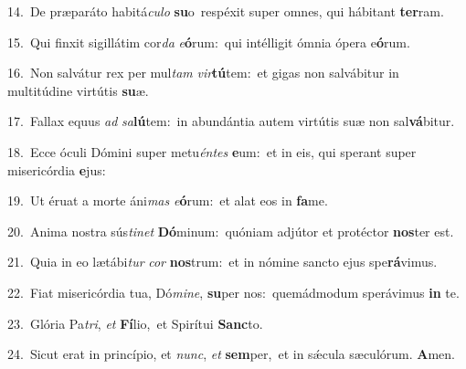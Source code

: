 {\numbfont\textcolor{\numbcolor}{14.}}~De præparáto habitá\-\textit{cu}\-\textit{lo} \textbf{su}\-o~\star respéxit super omnes, qui hábitant \textbf{ter}\-ram.\par
{\numbfont\textcolor{\numbcolor}{15.}}~Qui finxit sigillátim cor\textit{da} \textit{e}\-\textbf{ó}rum:~\star qui intélligit ómnia ópera e\-\textbf{ó}\-rum.\par
{\numbfont\textcolor{\numbcolor}{16.}}~Non salvátur rex per mul\textit{tam} \textit{vir}\-\textbf{tú}tem:~\star et gigas non salvábitur in multitúdine virtútis \textbf{su}\-æ.\par
{\numbfont\textcolor{\numbcolor}{17.}}~Fallax equus \textit{ad} \textit{sa}\-\textbf{lú}tem:~\star in abundántia autem virtútis suæ non sal\-\textbf{vá}\-bitur.\par
{\numbfont\textcolor{\numbcolor}{18.}}~Ecce óculi Dómini super metu\-\textit{én}\-\textit{tes} \textbf{e}\-um:~\star et in eis, qui sperant super misericórdia \textbf{e}\-jus:\par
{\numbfont\textcolor{\numbcolor}{19.}}~Ut éruat a morte áni\textit{mas} \textit{e}\-\textbf{ó}rum:~\star et alat eos in \textbf{fa}\-me.\par
{\numbfont\textcolor{\numbcolor}{20.}}~Anima nostra sús\-\textit{ti}\-\textit{net} \textbf{Dó}\-minum:~\star quóniam adjútor et protéctor \textbf{nos}\-ter est.\par
{\numbfont\textcolor{\numbcolor}{21.}}~Quia in eo lætábi\textit{tur} \textit{cor} \textbf{nos}\-trum:~\star et in nómine sancto ejus spe\-\textbf{rá}\-vimus.\par
{\numbfont\textcolor{\numbcolor}{22.}}~Fiat misericórdia tua, Dó\-\textit{mi}\-\textit{ne}, \textbf{su}\-per nos:~\star quemádmodum sperávimus \textbf{in} te.\par
{\numbfont\textcolor{\numbcolor}{23.}}~Glória Pa\-\textit{tri}\-, \textit{et} \textbf{Fí}\-lio,~\star et Spirítui \textbf{Sanc}\-to.\par
{\numbfont\textcolor{\numbcolor}{24.}}~Sicut erat in princípio, et \textit{nunc}\-, \textit{et} \textbf{sem}\-per,~\star et in sǽcula sæculórum. \textbf{A}\-men.\par
